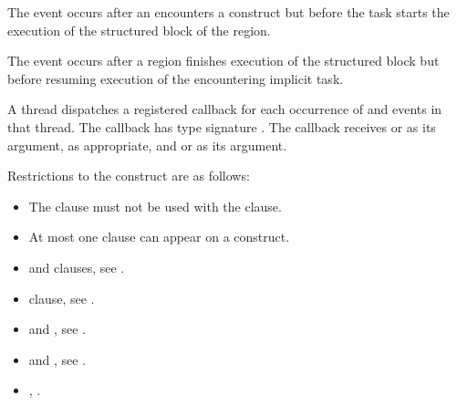 \events

The  event occurs after an  encounters a 
 construct but before the task starts the execution of the structured 
block of the  region.

The  event occurs after a  region finishes execution of the structured block 
but before resuming execution of the encountering implicit task.


\tools

A thread dispatches a registered 
callback for each occurrence of  and
 events in that thread. The callback has type signature
. The callback receives
 or  
as its  argument, as appropriate, and
 or  
as its  argument.

\restrictions
Restrictions to the  construct are as follows: 

\begin{itemize}
\item The  clause must not be used with the  clause.

\item At most one  clause can appear on a  construct.

\end{itemize}


\crossreferences
\begin{itemize}
\item {} and  clauses, see 
.

\item {} clause, see 
.

\item {} and , see
  .

\item {} and , see
.

\item {},
.

\end{itemize}












